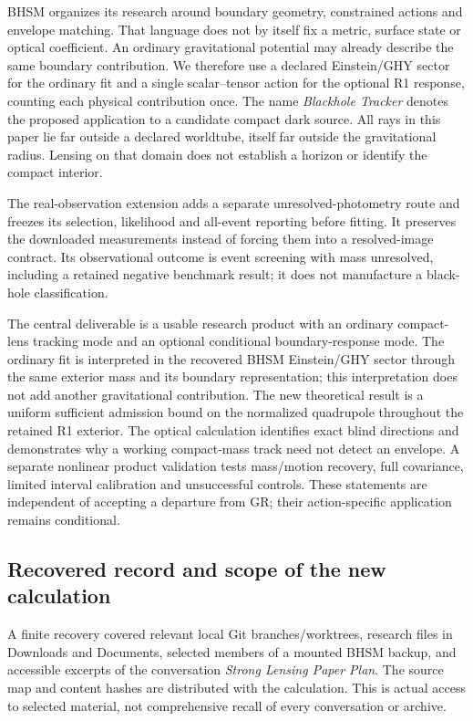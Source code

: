 \documentclass[11pt,a4paper]{article}
\begin{document}
BHSM organizes its research around boundary geometry, constrained actions
and envelope matching. That language does not by itself fix a metric,
surface state or optical coefficient. An ordinary gravitational potential
may already describe the same boundary contribution. We therefore use a
declared Einstein/GHY sector for the ordinary fit and a single
scalar--tensor action for the optional R1 response, counting each
physical contribution once. The name
\emph{Blackhole Tracker} denotes the proposed application to a candidate
compact dark source. All rays in this paper lie far outside a declared
worldtube, itself far outside the gravitational radius. Lensing on that
domain does not establish a horizon or identify the compact interior.

The real-observation extension adds a separate unresolved-photometry
route and freezes its selection, likelihood and all-event reporting
before fitting. It preserves the downloaded measurements instead of
forcing them into a resolved-image contract. Its observational outcome is
event screening with mass unresolved, including a retained negative
benchmark result; it does not manufacture a black-hole classification.

The central deliverable is a usable research product with an ordinary
compact-lens tracking mode and an optional conditional boundary-response
mode. The ordinary fit is interpreted in the recovered BHSM Einstein/GHY
sector through the same exterior mass and its boundary representation;
this interpretation does not add another gravitational contribution.
The new theoretical result is a uniform sufficient admission bound
on the normalized quadrupole throughout the retained R1 exterior. The
optical calculation identifies exact blind directions and demonstrates
why a working compact-mass track need not detect an envelope. A separate
nonlinear product validation tests mass/motion recovery, full covariance,
limited interval calibration and unsuccessful controls. These statements
are independent of accepting a departure from GR; their action-specific
application remains conditional.

\subsection{Recovered record and scope of the new calculation}

A finite recovery covered relevant local Git branches/worktrees, research
files in Downloads and Documents, selected members of a mounted BHSM
backup, and accessible excerpts of the conversation \emph{Strong Lensing
Paper Plan}. The source map and content hashes are distributed with the
calculation. This is actual access to selected material, not comprehensive
recall of every conversation or archive.
\end{document}
